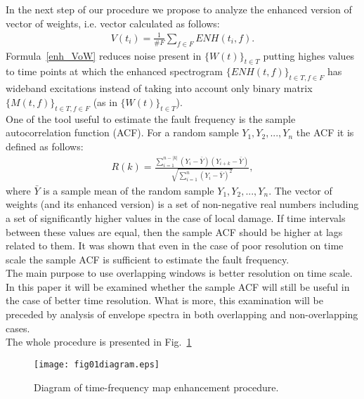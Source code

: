 \documentclass[3p,times]{elsarticle}
\begin{document}
In the next step of our procedure we propose to analyze the enhanced version of vector of weights, i.e. vector calculated as follows:
\begin{eqnarray}\label{row4}
V(t_i)=\frac{1}{\#F}\sum_{f\in F}ENH(t_i,f).
\label{enh_VoW}\end{eqnarray}
Formula~\ref{enh_VoW} reduces noise present in $\{W(t)\}_{t\in T}$ putting highes values to time points at which the enhanced spectrogram $\{ENH(t,f)\}_{t\in T, f\in F}$ has wideband excitations instead of taking into account only binary matrix $\{M(t,f)\}_{t\in T, f\in F}$ (as in $\{W(t)\}_{t\in T}$).\\
One of the tool useful to estimate the fault frequency is the sample autocorrelation function (ACF). For a random sample $Y_1,Y_2,...,Y_n$ the ACF  it is defined as follows:
\begin{eqnarray}
R(k)=\frac{\sum_{i=1}^{n-|k|}(Y_i-\bar{Y})(Y_{i+k}-\bar{Y})}{\sqrt{\sum_{i=1}^n(Y_i-\bar{Y})^2}},
\end{eqnarray}
where $\bar{Y}$ is a sample mean of the random sample $Y_1,Y_2,...,Y_n$. The vector of weights (and its enhanced version) is a set of non-negative real numbers including a set of significantly higher values in the case of local damage. If time intervals between these values are equal, then the sample ACF should be higher at lags related to them. It was shown that even in the case of poor resolution on time scale the sample ACF is sufficient to estimate the fault frequency.\\
The main purpose to use overlapping windows is better resolution on time scale. In this paper it will be examined whether the sample ACF will still be useful in the case of better time resolution. What is more, this examination will be preceded by analysis of envelope spectra in both overlapping and non-overlapping cases.\\
The whole procedure is presented in Fig.~\ref{fig01}
\begin{figure}[ht]
\begin{center}
\texttt{[image: fig01diagram.eps]}
\caption{Diagram of time-frequency map enhancement procedure.}\label{fig01}
\end{center}
\end{figure}
\end{document}
